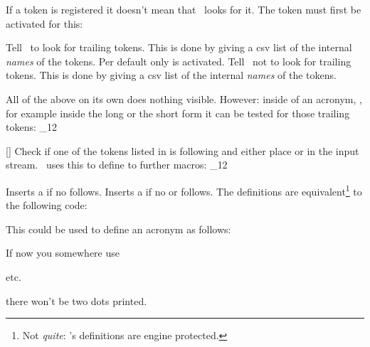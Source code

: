 \documentclass[load-preamble+]{cnltx-doc}
\makeatletter
\renewenvironment{commands}
  {%
    \cnltx@set@catcode_{12}%
    \let\command\cnltx@command
    \cnltxlist
  }
  {\endcnltxlist}
\makeatother
\begin{document}
If a token is registered it doesn't mean that \acro\ looks for it.  The token
must first be activated for this:
\begin{options}
    Tell \acro\ to look for trailing tokens.  This is done by giving a csv
    list of the internal \emph{names} of the tokens.  Per default only
     is activated.
    Tell \acro\ not to look for trailing tokens.  This is done by giving a csv
    list of the internal \emph{names} of the tokens.
\end{options}

All of the above on its own does nothing visible. However: inside of an
acronym, \ie, for example inside the long or the short form it can be tested
for those trailing tokens:
\begin{commands}
  \command{aciftrailing}[]
    Check if one of the tokens listed in  is
    following and either place  or  in the input
    stream.
\end{commands}
\acro\ uses this to define to further macros:
\begin{commands}
  \command{acdot} Inserts a  if no  follows.
  \command{acspace} Inserts a  if no  or
     follows.
\end{commands}
The definitions are equivalent\footnote{Not \emph{quite}: \acro's definitions
  are engine protected.} to the following code:
\begin{sourcecode}
  \newcommand*\acdot{\aciftrailing{dot}{}{.\@}}
  \newcommand*\acspace{\aciftrailing{dash,babel-hyphen}{}{\space}}
\end{sourcecode}

This could be used to define an acronym as follows:
\begin{sourcecode}
\end{sourcecode}
If now you somewhere use
\begin{sourcecode}
  \ac{etc}.
\end{sourcecode}
there won't be two dots printed.
\end{document}
